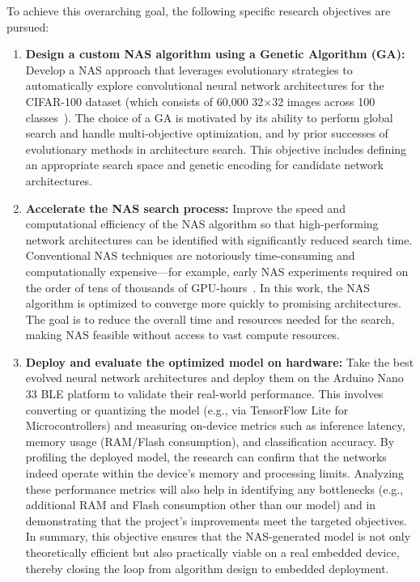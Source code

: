 To achieve this overarching goal, the following specific research objectives are pursued:
 
\begin{enumerate}
    \item \textbf{Design a custom NAS algorithm using a Genetic Algorithm (GA):} Develop a NAS approach that leverages evolutionary strategies to automatically explore convolutional neural network architectures for the CIFAR-100 dataset (which consists of 60,000 32$\times$32 images across 100 classes~\cite{cifar}). The choice of a GA is motivated by its ability to perform global search and handle multi-objective optimization, and by prior successes of evolutionary methods in architecture search. This objective includes defining an appropriate search space and genetic encoding for candidate network architectures.

    \item \textbf{Accelerate the NAS search process:} Improve the speed and computational efficiency of the NAS algorithm so that high-performing network architectures can be identified with significantly reduced search time. Conventional NAS techniques are notoriously time-consuming and computationally expensive---for example, early NAS experiments required on the order of tens of thousands of GPU-hours~\cite{pham2018efficient}. In this work, the NAS algorithm is optimized to converge more quickly to promising architectures. The goal is to reduce the overall time and resources needed for the search, making NAS feasible without access to vast compute resources.



    \item \textbf{Deploy and evaluate the optimized model on hardware:} Take the best evolved neural network architectures and deploy them on the Arduino Nano 33 BLE platform to validate their real-world performance. This involves converting or quantizing the model (e.g., via TensorFlow Lite for Microcontrollers) and measuring on-device metrics such as inference latency, memory usage (RAM/Flash consumption), and classification accuracy. By profiling the deployed model, the research can confirm that the networks indeed operate within the device’s memory and processing limits. Analyzing these performance metrics will also help in identifying any bottlenecks (e.g., additional RAM and Flash consumption other than our model) and in demonstrating that the project’s improvements meet the targeted objectives. In summary, this objective ensures that the NAS-generated model is not only theoretically efficient but also practically viable on a real embedded device, thereby closing the loop from algorithm design to embedded deployment.
\end{enumerate}


